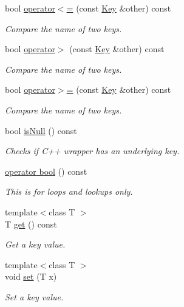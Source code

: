 \begin{DoxyCompactItemize}
bool \hyperlink{classkdb_1_1Key_a3b466f59870b989aa9ec41558bba4d19}{operator$<$=} (const \hyperlink{classkdb_1_1Key}{Key} \&other) const 
\begin{DoxyCompactList}\small\item\em Compare the name of two keys.  \end{DoxyCompactList}\item 
bool \hyperlink{classkdb_1_1Key_a1bd2b165eeade6a71401b9b122864bad}{operator$>$} (const \hyperlink{classkdb_1_1Key}{Key} \&other) const 
\begin{DoxyCompactList}\small\item\em Compare the name of two keys.  \end{DoxyCompactList}\item 
bool \hyperlink{classkdb_1_1Key_aa1258657e3dbddf4aed3716dd63d2a3c}{operator$>$=} (const \hyperlink{classkdb_1_1Key}{Key} \&other) const 
\begin{DoxyCompactList}\small\item\em Compare the name of two keys.  \end{DoxyCompactList}\item 
bool \hyperlink{classkdb_1_1Key_a46ac7f1f28842e6edc03b2f97ae14bdc}{is\-Null} () const 
\begin{DoxyCompactList}\small\item\em Checks if C++ wrapper has an underlying key. \end{DoxyCompactList}\item 
\hyperlink{classkdb_1_1Key_ac203d41896988df49dd149c2a6ad91d8}{operator bool} () const 
\begin{DoxyCompactList}\small\item\em This is for loops and lookups only. \end{DoxyCompactList}\item 
{\footnotesize template$<$class T $>$ }\\T \hyperlink{classkdb_1_1Key_ae8f4cf386b825c8efc29ce0db977f0d2}{get} () const 
\begin{DoxyCompactList}\small\item\em Get a key value. \end{DoxyCompactList}\item 
{\footnotesize template$<$class T $>$ }\\void \hyperlink{classkdb_1_1Key_a615124f0a2b291e03975b49c233654d7}{set} (T x)
\begin{DoxyCompactList}\small\item\em Set a key value. \end{DoxyCompactList}\item 

\end{DoxyCompactItemize}
